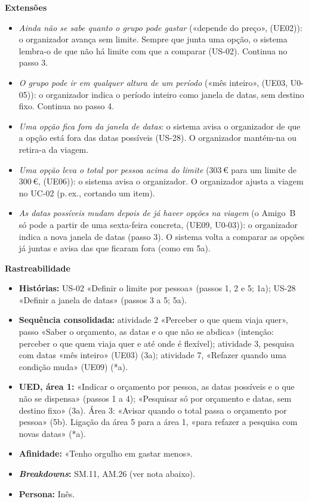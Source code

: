 \documentclass[11pt,a4paper]{article}
\newcommand{\reg}[1]{{\footnotesize\textcolor{pendente}{(#1)}}}
\newenvironment{usecase}[2]{%
  \par\medskip\noindent{\large\bfseries\color{roamly}#1: #2}\par\smallskip\small\noindent\ignorespaces}{\par\medskip}
\begin{document}
\begin{usecase}{UC-01}{Definir os limites da viagem}
\textbf{Extensões}
\begin{itemize}[leftmargin=2.2em]
  \item[1a.] \textit{Ainda não se sabe quanto o grupo pode gastar} («depende do preço», \reg{UE02}): o organizador avança sem limite. Sempre que junta uma opção, o sistema lembra-o de que não há limite com que a comparar (US-02). Continua no passo 3.
  \item[3a.] \textit{O grupo pode ir em qualquer altura de um período} («mês inteiro», \reg{UE03, U0-05}): o organizador indica o período inteiro como janela de datas, sem destino fixo. Continua no passo 4.
  \item[5a.] \textit{Uma opção fica fora da janela de datas}: o sistema avisa o organizador de que a opção está fora das datas possíveis (US-28). O organizador mantém-na ou retira-a da viagem.
  \item[5b.] \textit{Uma opção leva o total por pessoa acima do limite} (303\,€ para um limite de 300\,€, \reg{UE06}): o sistema avisa o organizador. O organizador ajusta a viagem no UC-02 (p.\,ex., cortando um item).
  \item[*a.] \textit{As datas possíveis mudam depois de já haver opções na viagem} (o Amigo~B só pode a partir de uma sexta-feira concreta, \reg{UE09, U0-03}): o organizador indica a nova janela de datas (passo 3). O sistema volta a comparar as opções já juntas e avisa das que ficaram fora (como em 5a).
\end{itemize}

\textbf{Rastreabilidade}
\begin{itemize}
  \item \textbf{Histórias:} US-02 «Definir o limite por pessoa» (passos 1, 2 e 5; 1a); US-28 «Definir a janela de datas» (passos 3 a 5; 5a).
  \item \textbf{Sequência consolidada:} atividade 2 «Perceber o que quem viaja quer», passo «Saber o orçamento, as datas e o que não se abdica» (intenção: perceber o que quem viaja quer e até onde é flexível); atividade 3, pesquisa com datas «mês inteiro» \reg{UE03} (3a); atividade 7, «Refazer quando uma condição muda» \reg{UE09} (*a).
  \item \textbf{UED, área 1:} «Indicar o orçamento por pessoa, as datas possíveis e o que não se dispensa» (passos 1 a 4); «Pesquisar só por orçamento e datas, sem destino fixo» (3a). Área 3: «Avisar quando o total passa o orçamento por pessoa» (5b). Ligação da área 5 para a área 1, «para refazer a pesquisa com novas datas» (*a).
  \item \textbf{Afinidade:} «Tenho orgulho em gastar menos».
  \item \textbf{\textit{Breakdowns}:} SM.11, AM.26 (ver nota abaixo).
  \item \textbf{Persona:} Inês.
\end{itemize}
\end{usecase}
\end{document}
